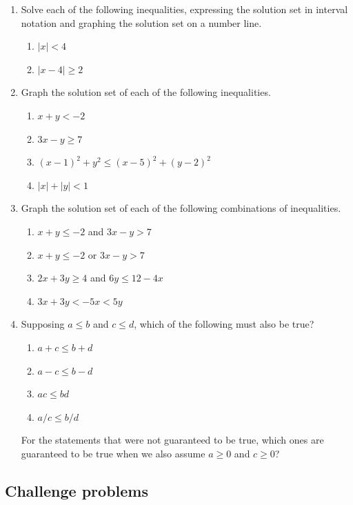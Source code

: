 \begin{enumerate}
\begin{enumerate}
\end{enumerate}
\item Solve each of the following inequalities, expressing the solution set in interval notation and graphing the solution set on a number line.
\begin{enumerate}
\item $\lvert x\rvert < 4$
\item $\lvert x - 4\rvert\geq 2$
\end{enumerate}
\item Graph the solution set of each of the following inequalities.
\begin{enumerate}
\item $x + y < -2$
\item $3x - y\geq 7$
\item $(x - 1)^2 + y^2\leq (x - 5)^2 + (y - 2)^2$
\item $\lvert x\rvert + \lvert y\rvert < 1$
\end{enumerate}
\item Graph the solution set of each of the following combinations of inequalities.
\begin{enumerate}
\item $x + y\leq -2$ and $3x - y > 7$
\item $x + y\leq -2$ or $3x - y > 7$
\item $2x + 3y\geq 4$ and $6y\leq 12 - 4x$
\item $3x + 3y < -5x < 5y$
\end{enumerate}
\item Supposing $a\leq b$ and $c\leq d$, which of the following must also be true?
\begin{enumerate}[label=(\Roman*)]
\item $a + c\leq b + d$
\item $a - c\leq b - d$
\item $ac\leq bd$
\item $a/c\leq b/d$
\end{enumerate}
For the statements that were not guaranteed to be true, which ones are guaranteed to be true when we also assume $a\geq 0$ and $c\geq 0$?
\end{enumerate}


\subsection{Challenge problems}

